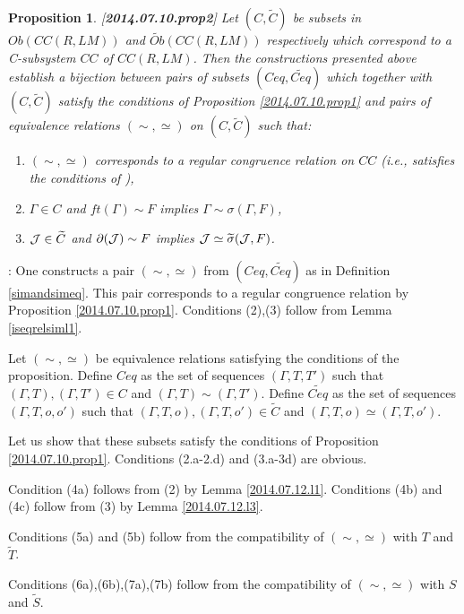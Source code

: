 \documentclass[11pt]{article}
\newenvironment{proof}{{\bf Proof}:}{\vskip 5mm }
\newtheorem{proposition}{Proposition}[subsection]
\newcommand{\llabel}[1]{\label{#1}[{\bf #1}]}
\newcommand{\wt}{\widetilde}
\begin{document}
\begin{proposition}
\llabel{2014.07.10.prop2}
Let $(C,\wt{C})$ be subsets in $Ob(CC(R,LM))$ and $\wt{Ob}(CC(R,LM))$ respectively which correspond to a C-subsystem $CC$ of $CC(R,LM)$. Then the constructions presented above establish a bijection between pairs of subsets $(Ceq,\wt{Ceq})$ which together with $(C,\wt{C})$ satisfy the conditions of Proposition \ref{2014.07.10.prop1} and pairs of equivalence relations $(\sim,\simeq)$ on $(C,\wt{C})$ such that:
%
\begin{enumerate}
\item $(\sim,\simeq)$ corresponds to a regular congruence relation on $CC$ (i.e., satisfies the conditions of \cite[Proposition 5.4]{Csubsystems}),
%
\item $\Gamma\in C$ and $ft(\Gamma)\sim F$ implies $\Gamma\sim \sigma(\Gamma,F)$,
%
\item ${\cal J}\in \wt{C}$ and $\partial({\cal J})\sim F$ implies ${\cal J}\simeq \wt{\sigma}({\cal J},F)$.
\end{enumerate}
\end{proposition}
%
\begin{proof}
One constructs a pair $(\sim,\simeq)$ from $(Ceq,\wt{Ceq})$ as in Definition \ref{simandsimeq}. 
This pair corresponds to a regular congruence relation by Proposition \ref{2014.07.10.prop1}.
Conditions (2),(3) follow from Lemma \ref{iseqrelsiml1}.

Let $(\sim,\simeq)$ be equivalence relations satisfying the conditions of the proposition. Define $Ceq$ as the set of sequences $(\Gamma,T,T')$ such that $(\Gamma,T), (\Gamma,T')\in C$ and $(\Gamma,T)\sim (\Gamma,T')$. Define $\wt{Ceq}$ as the set of sequences $(\Gamma,T,o,o')$ such that $(\Gamma,T,o),(\Gamma,T,o')\in \wt{C}$ and $(\Gamma,T,o)\simeq (\Gamma,T,o')$. 

Let us show that these subsets satisfy the conditions of Proposition \ref{2014.07.10.prop1}. Conditions (2.a-2.d) and (3.a-3d) are obvious. 

Condition (4a) follows from (2) by Lemma \ref{2014.07.12.l1}.
Conditions (4b) and (4c) follow from (3) by Lemma \ref{2014.07.12.l3}.

Conditions (5a) and (5b) follow from the compatibility of $(\sim,\simeq)$ with $T$ and $\wt{T}$. 

Conditions (6a),(6b),(7a),(7b) follow from the compatibility of $(\sim,\simeq)$ with $S$ and $\wt{S}$.
\end{proof}
\end{document}
